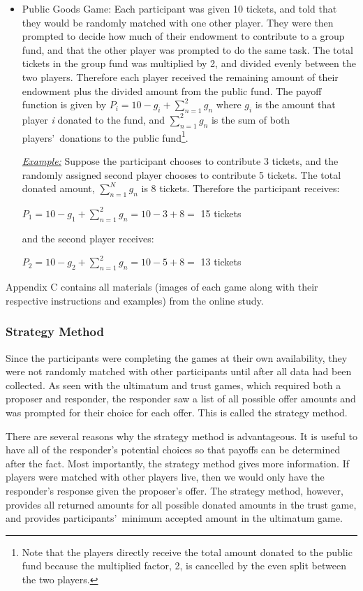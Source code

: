 \documentclass[12pt]{article}
\begin{document}
\begin{itemize}
\item{Public Goods Game}: Each participant was given 10 tickets, and told that they would be randomly matched with one other player. They were then prompted to decide how much of their endowment to contribute to a group fund, and that the other player was prompted to do the same task. The total tickets in the group fund was multiplied by 2, and divided evenly between the two players. Therefore each player received the remaining amount of their endowment plus the divided amount from the public fund. The payoff function is given by \( P_{i} = 10 - g_{i} + \sum_{n=1}^{2} g_{n} \) where \(g_{i}\) is the amount that player \textit{i} donated to the fund, and \(\sum_{n=1}^{2}g_{n}\) is the sum of both players\rq \ donations to the public fund\footnote{Note that the players directly receive the total amount donated to the public fund because the multiplied factor, 2, is cancelled by the even split between the two players.}.

\subitem \underline{\textit{Example:}} Suppose the participant chooses to contribute 3 tickets, and the randomly assigned second player chooses to contribute 5 tickets. The total donated amount, \(\sum_{n=1}^{N} g_{n}\) is 8 tickets. Therefore the participant receives: 

\( P_{1} = 10 - g_{1} +  \sum_{n=1}^{2} g_{n} = 10 - 3 + 8 = \) 15 tickets 

and the second player receives: 

\( P_{2} = 10 - g_{2} +  \sum_{n=1}^{2} g_{n} = 10 - 5 + 8 = \) 13 tickets 


\end{itemize}

Appendix C contains all materials (images of each game along with their respective instructions and examples) from the online study.

\subsubsection{Strategy Method}

Since the participants were completing the games at their own availability, they were not randomly matched with other participants until after all data had been collected. As seen with the ultimatum and trust games, which required both a proposer and responder, the responder saw a list of all possible offer amounts and was prompted for their choice for each offer. This is called the strategy method.

There are several reasons why the strategy method is advantageous. It is useful to have all of the responder\rq s potential choices so that payoffs can be determined after the fact. Most importantly, the strategy method gives more information. If players were matched with other players live, then we would only have the responder\rq s response given the proposer\rq s offer. The strategy method, however, provides all returned amounts for all possible donated amounts in the trust game, and provides participants\rq \ minimum accepted amount in the ultimatum game. 
\end{document}
